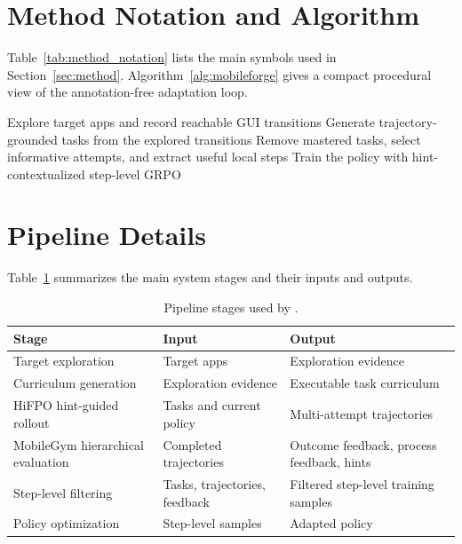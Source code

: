 \section{Method Notation and Algorithm}
\label{sec:appendix_method_details}

Table~\ref{tab:method_notation} lists the main symbols used in Section~\ref{sec:method}. Algorithm~\ref{alg:mobileforge} gives a compact procedural view of the annotation-free adaptation loop.



\begin{algorithm}[t]
\caption{\ourmethod annotation-free adaptation loop}
\label{alg:mobileforge}
Explore target apps and record reachable GUI transitions\;
Generate trajectory-grounded tasks from the explored transitions\;
Remove mastered tasks, select informative attempts, and extract useful local steps\;
Train the policy with hint-contextualized step-level GRPO\;
\;
\end{algorithm}

\section{Pipeline Details}
\label{sec:appendix_pipeline}

Table~\ref{tab:appendix_pipeline} summarizes the main system stages and their inputs and outputs.

\begin{table}[t]
\centering
\paperTable
\caption{Pipeline stages used by \ourmethod.}
\label{tab:appendix_pipeline}
\begin{tabular}{@{}l l l@{}}
\toprule
\textbf{Stage} & \textbf{Input} & \textbf{Output} \\
\midrule
Target exploration & Target apps & Exploration evidence \\
Curriculum generation & Exploration evidence & Executable task curriculum \\
HiFPO hint-guided rollout & Tasks and current policy & Multi-attempt trajectories \\
MobileGym hierarchical evaluation & Completed trajectories & Outcome feedback, process feedback, hints \\
Step-level filtering & Tasks, trajectories, feedback & Filtered step-level training samples \\
Policy optimization & Step-level samples & Adapted policy \\
\bottomrule
\end{tabular}
\end{table}


